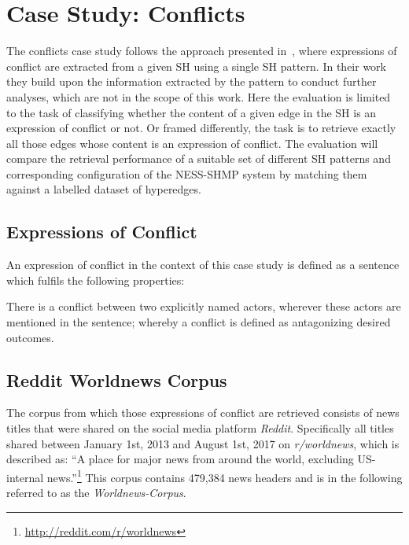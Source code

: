 \documentclass[11pt]{scrreprt}
\let\citef\cite  %
\let\cite\parencite  %
\begin{document}
\section{Case Study: Conflicts}
The conflicts case study follows the approach presented in \citef{menezesSemanticHypergraphs2021}, where expressions of conflict are extracted from a given SH using a single SH pattern. In their work they build upon the information extracted by the pattern to conduct further analyses, which are not in the scope of this work. Here the evaluation is limited to the task of classifying whether the content of a given edge in the SH is an expression of conflict or not. Or framed differently, the task is to retrieve exactly all those edges whose content is an expression of conflict. The evaluation will compare the retrieval performance of a suitable set of different SH patterns and corresponding configuration of the NESS-SHMP system by matching them against a labelled dataset of hyperedges.


\subsection{Expressions of Conflict}
\label{sec:conflict-definition}
An expression of conflict in the context of this case study is defined as a sentence which fulfils the following properties:

\begin{displayquote}
There is a conflict between two explicitly named actors, wherever these actors are mentioned in the sentence; whereby a conflict is defined as antagonizing desired outcomes.
\end{displayquote}

\subsection{Reddit Worldnews Corpus}
The corpus from which those expressions of conflict are retrieved consists of news titles that were shared on the social media platform \textit{Reddit}. Specifically all titles shared between January 1st, 2013 and August 1st, 2017 on \textit{r/worldnews}, which is described as: “A place for major news from around the world, excluding US-internal news.”\footnote{\url{http://reddit.com/r/worldnews}} This corpus contains 479,384 news headers and is in the following referred to as the \textit{Worldnews-Corpus}.
\end{document}
